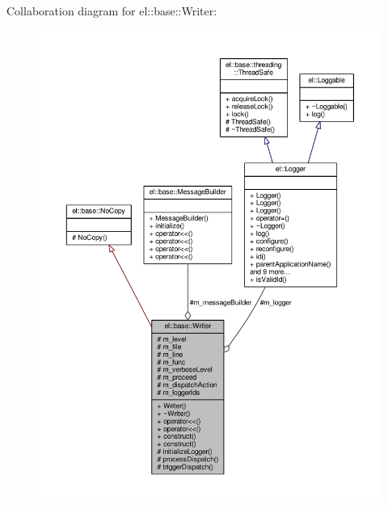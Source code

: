 Collaboration diagram for el\+:\+:base\+:\+:Writer\+:
\nopagebreak
\begin{figure}[H]
\begin{center}
\leavevmode
\includegraphics[width=350pt]{d7/d0d/classel_1_1base_1_1Writer__coll__graph}
\end{center}
\end{figure}
